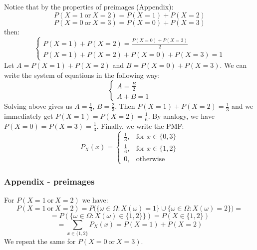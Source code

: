\documentclass{article}
\begin{document}
Notice that by the properties of preimages (Appendix):
\begin{equation*}
    P(X=1 \ \mbox{or} \ X=2) = P(X=1) + P(X=2)
\end{equation*}
\begin{equation*}
    P(X=0 \ \mbox{or} \ X=3) = P(X=0) + P(X=3)
\end{equation*}
then:
\begin{equation*}
\begin{cases}
      P(X=1) + P(X=2) = \frac{P(X=0) + P(X=3)}{2} \\
      P(X=1) + P(X=2) + P(X=0) + P(X=3) = 1
\end{cases}  
\end{equation*}
%
Let \(A = P(X=1) + P(X=2)\) and \(B = P(X=0) + P(X=3)\). We can write the system of equations in the following way:
\begin{equation*}
    \begin{cases}
      A = \frac{B}{2} \\
      A + B = 1
\end{cases}  
\end{equation*}
Solving above gives us \(A = \frac{1}{3}\), \(B = \frac{2}{3}\). Then \(P(X=1) + P(X=2) = \frac{1}{3}\) and we immediately
get \(P(X=1) = P(X=2) = \frac{1}{6}\). By analogy, we have \(P(X=0) = P(X=3) = \frac{1}{3}\). Finally, we write the PMF:
\begin{equation*}
    P_{X}(x) = 
    \begin{cases}
        \frac{1}{3}, & \mbox{for \(x \in \{0, 3\}\)} \\
        \frac{1}{6}, & \mbox{for \(x \in \{1, 2\}\)} \\
        0, & \mbox{otherwise}
    \end{cases}
\end{equation*}
\subsubsection*{Appendix - preimages}
For \(P(X=1 \ \mbox{or} \ X=2)\) we have:
\begin{equation*}
    P(X=1 \ \mbox{or} \ X=2) = P\Bigg(\{\omega \in \Omega: X(\omega) = 1\} \cup \{\omega \in \Omega: X(\omega) = 2\}\Bigg) =
\end{equation*}
\begin{equation*}
    = P(\{\omega \in \Omega: X(\omega) \in \{1, 2\}\}) = P(X \in \{1, 2\})
\end{equation*}
\begin{equation*}
    = \sum_{x \in \{1,2\}}P_{X}(x) = P(X=1) + P(X=2)
\end{equation*}
We repeat the same for \(P(X=0 \ \mbox{or} \ X=3)\).
\end{document}

